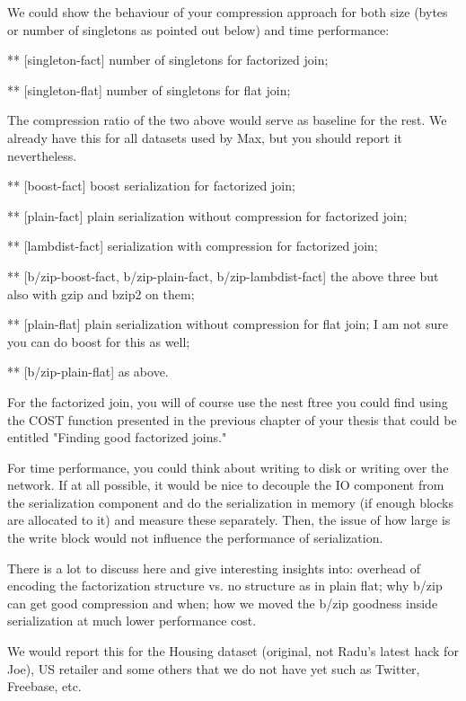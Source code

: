 We could show the behaviour of your compression approach for both size (bytes or number of singletons as pointed out below) and time performance: 

** [singleton-fact] number of singletons for factorized join;

** [singleton-flat] number of singletons for flat join;

The compression ratio of the two above would serve as baseline for the rest. We already have this for all datasets used by Max, but you should report it nevertheless.

** [boost-fact] boost serialization for factorized join; 

** [plain-fact] plain serialization without compression for factorized join;
 
** [lambdist-fact] serialization with compression for factorized join; 

** [b/zip-boost-fact, b/zip-plain-fact, b/zip-lambdist-fact] the above three but also with gzip and bzip2 on them; 

** [plain-flat] plain serialization without compression for flat join; I am not sure you can do boost for this as well;

** [b/zip-plain-flat] as above.

For the factorized join, you will of course use the nest ftree you could find using the COST function presented in the previous chapter of your thesis that could be entitled "Finding good factorized joins."

For time performance, you could think about writing to disk or writing over the network. If at all possible, it would be nice to decouple the IO component from the serialization component and do the serialization in memory (if enough blocks are allocated to it) and measure these separately. Then, the issue of how large is the write block would not influence the performance of serialization.

There is a lot to discuss here and give interesting insights into: overhead of encoding the factorization structure vs. no structure as in plain flat; why b/zip can get good compression and when; how we moved the b/zip goodness inside serialization at much lower performance cost.

We would report this for the Housing dataset (original, not Radu's latest hack for Joe), US retailer and some others that we do not have yet such as Twitter, Freebase, etc.

\medskip


